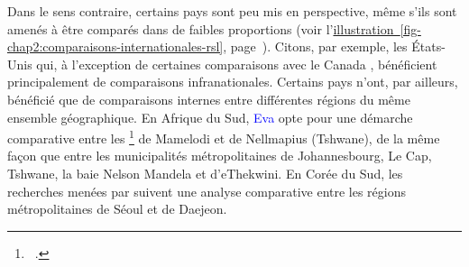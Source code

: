 \begin{refsegment}
Dans le sens contraire, certains pays sont peu mis en perspective, même s'ils sont amenés à être comparés dans de faibles proportions (voir l'\hyperref[fig-chap2:comparaisons-internationales-rsl]{illustration~\ref{fig-chap2:comparaisons-internationales-rsl}}, page~\pageref{fig-chap2:comparaisons-internationales-rsl}). Citons, par exemple, les États-Unis qui, à l'exception de certaines comparaisons avec le Canada \textcolor{blue}{\autocites[11-16]{ensor_forecasting_2010}[7]{schneider_integration_2005}[83]{pucher_integrating_2009}}, bénéficient principalement de comparaisons infranationales. Certains pays n'ont, par ailleurs, bénéficié que de comparaisons internes entre différentes régions du même ensemble géographique. En Afrique du Sud, \textcolor{blue}{Eva} \textcolor{blue}{\textcite[34]{bechstein_cycling_2010}} opte pour une démarche comparative entre les \footnote{
    ~\textcolor{blue}{\autocite{geoconfluences_township_2023}}.
} de Mamelodi et de Nellmapius (Tshwane), de la même façon que \textcolor{blue}{\textcite[368]{cooke_relationship_2018}} entre les municipalités métropolitaines de Johannesbourg, Le Cap, Tshwane, la baie Nelson Mandela et d'eThekwini. En Corée du Sud, les recherches menées par \textcolor{blue}{\textcite[43, 980]{lee_strategies_2010, lee_bicycle-based_2016}} suivent une analyse comparative entre les régions métropolitaines de Séoul et de Daejeon.%


\end{refsegment}
